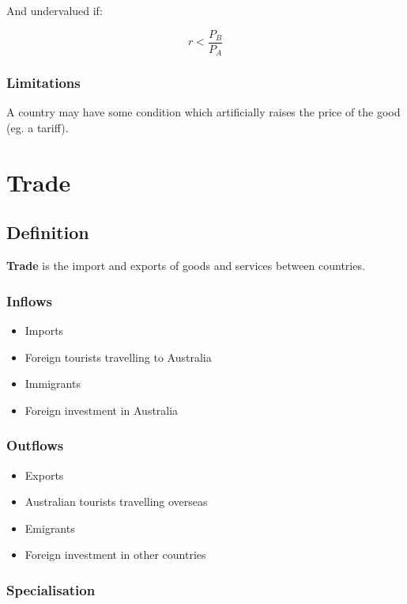 \documentclass[a4paper,11pt]{report}
\begin{document}
And undervalued if:

$$
r < \frac{P_B}{P_A}
$$

\subsection{Limitations}

A country may have some condition which artificially raises the price of the
good (eg. a tariff).




\chapter{Trade}

\section{Definition}

\textbf{Trade} is the import and exports of goods and services between
countries.

\subsection{Inflows}

\begin{itemize}
\item Imports
\item Foreign tourists travelling to Australia
\item Immigrants
\item Foreign investment in Australia
\end{itemize}

\subsection{Outflows}

\begin{itemize}
\item Exports
\item Australian tourists travelling overseas
\item Emigrants
\item Foreign investment in other countries
\end{itemize}

\subsection{Specialisation}
\end{document}
